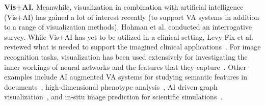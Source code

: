 

\vspace{1pt}
\noindent\textbf{Vis+AI.} Meanwhile, visualization in combination with artificial intelligence (Vis+AI) has gained a lot of interest recently (to support VA systems in addition to a range of visualization methods). Hohman et al. conducted an interrogative survey.
While Vis+AI has yet to be utilized in a clinical setting, Levy-Fix et al. reviewed what is needed to support the imagined clinical applications~\cite{levy2019machine}. For image recognition tasks, visualization has been used extensively for investigating the inner workings of neural networks and the features that they capture~\cite{olah2017feature, 8022871, 8017583, 8827593}. Other examples include AI augmented VA systems for studying semantic features in documents~\cite{ji2019visual},  high-dimensional phenotype analysis~\cite{8827951}, AI driven graph visualization~\cite{8017580,8805452}, and in-situ image prediction for scientific simulations~\cite{he2019insitunet}.






